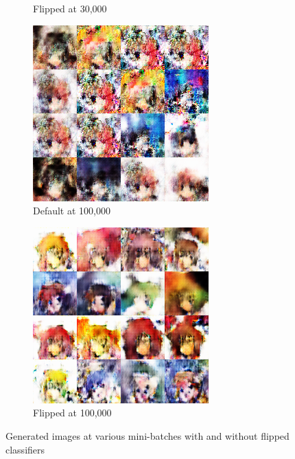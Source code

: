 \documentclass{article} %
\begin{document}
\begin{figure}[h!]
\begin{subfigure}[b]{0.24\linewidth}
		\caption{Flipped at 30,000}
		\label{fig:kerasLabelsFlipped30k}
	\end{subfigure}
	\begin{subfigure}[b]{0.24\linewidth}
		\includegraphics[width=\linewidth]{syed-default-100k.png}
		\caption{Default at 100,000}
		\label{fig:kerasLabelsDefault100k}
	\end{subfigure}
	\begin{subfigure}[b]{0.24\linewidth}
		\includegraphics[width=\linewidth]{syed-flipped-100k.png}
		\caption{Flipped at 100,000}
		\label{fig:kerasLabelsFlipped100k}
	\end{subfigure}
	\caption{Generated images at various mini-batches with and without flipped classifiers}
	\label{fig:kerasLabelsGen}
\end{figure}
\end{document}
